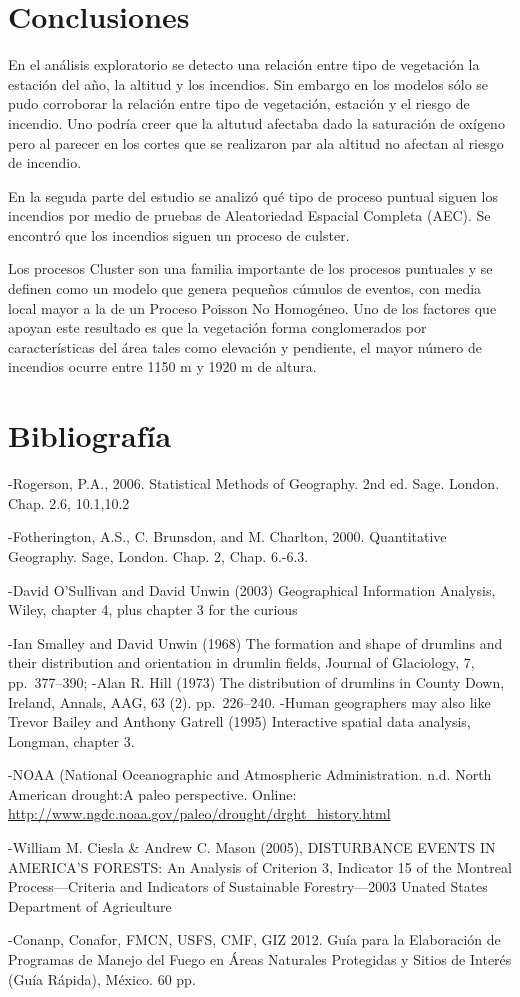 \documentclass[12,]{article}
\begin{document}
\section{Conclusiones}\label{conclusiones}

En el análisis exploratorio se detecto una relación entre tipo de
vegetación la estación del año, la altitud y los incendios. Sin embargo
en los modelos sólo se pudo corroborar la relación entre tipo de
vegetación, estación y el riesgo de incendio. Uno podría creer que la
altutud afectaba dado la saturación de oxígeno pero al parecer en los
cortes que se realizaron par ala altitud no afectan al riesgo de
incendio.

En la seguda parte del estudio se analizó qué tipo de proceso puntual
siguen los incendios por medio de pruebas de Aleatoriedad Espacial
Completa (AEC). Se encontró que los incendios siguen un proceso de
culster.

Los procesos Cluster son una familia importante de los procesos
puntuales y se definen como un modelo que genera pequeños cúmulos de
eventos, con media local mayor a la de un Proceso Poisson No Homogéneo.
Uno de los factores que apoyan este resultado es que la vegetación forma
conglomerados por características del área tales como elevación y
pendiente, el mayor número de incendios ocurre entre 1150 m y 1920 m de
altura.

\section{Bibliografía}\label{bibliografia}

-Rogerson, P.A., 2006. Statistical Methods of Geography. 2nd ed. Sage.
London. Chap. 2.6, 10.1,10.2

-Fotherington, A.S., C. Brunsdon, and M. Charlton, 2000. Quantitative
Geography. Sage, London. Chap. 2, Chap. 6.-6.3.

-David O'Sullivan and David Unwin (2003) Geographical Information
Analysis, Wiley, chapter 4, plus chapter 3 for the curious

-Ian Smalley and David Unwin (1968) The formation and shape of drumlins
and their distribution and orientation in drumlin fields, Journal of
Glaciology, 7, pp.~377--390; -Alan R. Hill (1973) The distribution of
drumlins in County Down, Ireland, Annals, AAG, 63 (2). pp.~226--240.
-Human geographers may also like Trevor Bailey and Anthony Gatrell
(1995) Interactive spatial data analysis, Longman, chapter 3.

-NOAA (National Oceanographic and Atmospheric Administration. n.d. North
American drought:A paleo perspective. Online:
\url{http://www.ngdc.noaa.gov/paleo/drought/drght_history.html}

-William M. Ciesla \& Andrew C. Mason (2005), DISTURBANCE EVENTS IN
AMERICA'S FORESTS: An Analysis of Criterion 3, Indicator 15 of the
Montreal Process---Criteria and Indicators of Sustainable
Forestry---2003 Unated States Department of Agriculture

-Conanp, Conafor, FMCN, USFS, CMF, GIZ 2012. Guía para la Elaboración de
Programas de Manejo del Fuego en Áreas Naturales Protegidas y Sitios de
Interés (Guía Rápida), México. 60 pp.
\end{document}
